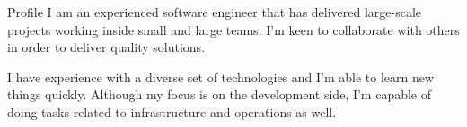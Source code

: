 \documentclass{resume} %
\begin{document}
\begin{rSection}{Profile}
I am an experienced software engineer that has delivered large-scale projects working inside small and large teams. I'm keen to collaborate with others in order to deliver quality solutions.

I have experience with a diverse set of technologies and I'm able to learn new things quickly. Although my focus is on the development side, I'm capable of doing tasks related to infrastructure and operations as well.

\end{rSection}



\end{document}
